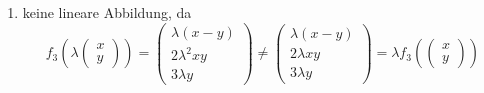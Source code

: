 \documentclass[a4paper,12pt]{article}
\begin{document}
\begin{enumerate}[label=\alph*)]
    \item keine lineare Abbildung, da
    \[
        f_3\!\left(\lambda\begin{pmatrix}x\\y\end{pmatrix}\right)
        = \begin{pmatrix}\lambda(x-y)\\2\lambda^2 xy\\3\lambda y\end{pmatrix}
        \neq
        \begin{pmatrix}\lambda(x-y)\\2\lambda xy\\3\lambda y\end{pmatrix}
        = \lambda f_3\!\left(\begin{pmatrix}x\\y\end{pmatrix}\right)
    \]

\end{enumerate}
\end{document}
